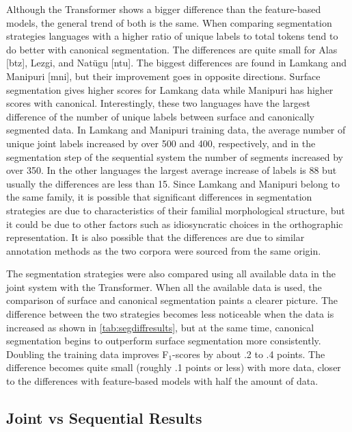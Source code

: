 Although the Transformer shows a bigger difference than the feature-based models, the general trend of both is the same. When comparing segmentation strategies languages with a higher ratio of unique labels to total tokens tend to do better with canonical segmentation. The differences are quite small for Alas [btz], Lezgi, and Nat\"ugu [ntu]. The biggest differences are found in Lamkang and Manipuri [mni], but their improvement goes in opposite directions. Surface segmentation gives higher scores for Lamkang data while Manipuri has higher scores with canonical. Interestingly, these two languages have the largest difference of the number of unique labels between surface and canonically segmented data. In Lamkang and Manipuri training data, the average number of unique joint labels increased by over 500 and 400, respectively, and in the segmentation step of the sequential system the number of segments increased by over 350. In the other languages the largest average increase of labels is 88 but usually the differences are less than 15. Since Lamkang and Manipuri belong to the same family, it is possible that significant differences in segmentation strategies are due to characteristics of their familial morphological structure, but it could be due to other factors such as idiosyncratic choices in the orthographic representation. 
It is also possible that the differences are due to similar annotation methods as the two corpora were sourced from the same origin. %

The segmentation strategies were also compared using all available data in the joint system with the Transformer.  When all the available data is used, the comparison of surface and canonical segmentation paints a clearer picture. The difference between the two strategies becomes less noticeable when the data is increased as shown in \autoref{tab:segdiffresults}, but at the same time, canonical segmentation begins to outperform surface segmentation more consistently.  
Doubling the training data improves F$_1$-scores by about .2 to .4 points. The difference becomes quite small (roughly .1 points or less) with more data, closer to the differences with feature-based models with half the amount of data. 


\subsection{Joint vs Sequential Results}

